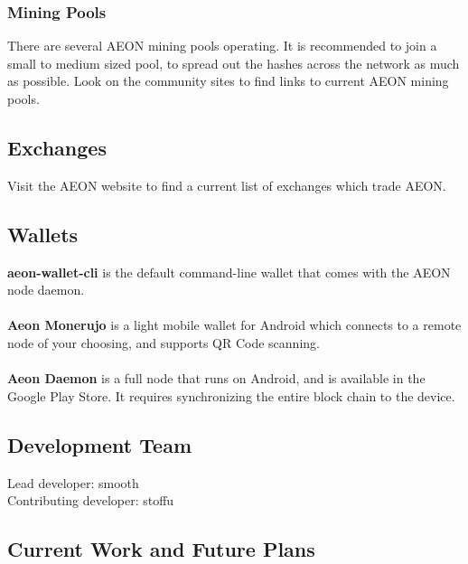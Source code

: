 \subsubsection{Mining Pools}
There are several AEON mining pools operating. It is recommended to join a small to medium sized pool, to spread out the hashes across the network as much as possible.  Look on the community sites to find links to current AEON mining pools.

\subsection{Exchanges}
Visit the AEON website to find a current list of exchanges which trade AEON.

\subsection{Wallets}
\textbf{aeon-wallet-cli} is the default command-line wallet that comes with the AEON node daemon.\\
\\
\textbf{Aeon Monerujo} is a light mobile wallet for Android which connects to a remote node of your choosing, and supports QR Code scanning.\\
\\
\textbf{Aeon Daemon} is a full node that runs on Android, and is available in the Google Play Store. It requires synchronizing the entire block chain to the device.

\subsection{Development Team}
Lead developer:		smooth\\
Contributing developer:	stoffu

\subsection{Current Work and Future Plans}

